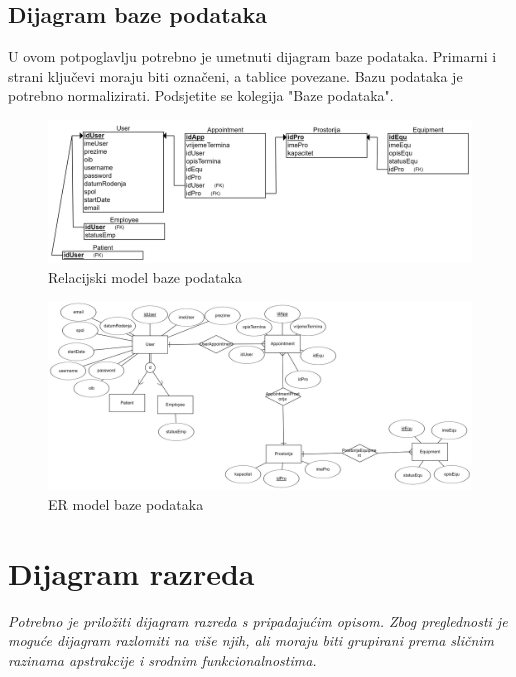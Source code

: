 			\newpage
			
			\subsection{Dijagram baze podataka}
				 U ovom potpoglavlju potrebno je umetnuti dijagram baze podataka. Primarni i strani ključevi moraju biti označeni, a tablice povezane. Bazu podataka je potrebno normalizirati. Podsjetite se kolegija "Baze podataka".
				
				\begin{figure}[H]
					\includegraphics[scale=0.14]{slike/bp_rel.PNG} %
					\centering
					\caption{Relacijski model baze podataka}
					\label{fig:promjene}
				\end{figure}
				
				\begin{figure}[H]
					\includegraphics[scale=0.085]{slike/bp_er.PNG} %
					\centering
					\caption{ER model baze podataka}
					\label{fig:promjene}
				\end{figure}
			
			\eject
			
			
		\section{Dijagram razreda}
		
			\textit{Potrebno je priložiti dijagram razreda s pripadajućim opisom. Zbog preglednosti je moguće dijagram razlomiti na više njih, ali moraju biti grupirani prema sličnim razinama apstrakcije i srodnim funkcionalnostima.}\\
			
